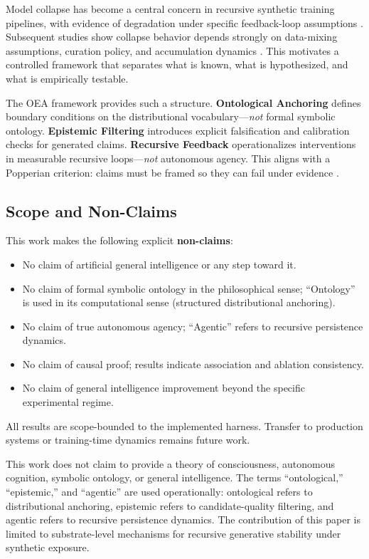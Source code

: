 \documentclass[11pt]{article}
\begin{document}
Model collapse has become a central concern in recursive synthetic training pipelines, with evidence of degradation under specific feedback-loop assumptions \cite{shumailov2024modelcollapse,fu2025theoretical}. Subsequent studies show collapse behavior depends strongly on data-mixing assumptions, curation policy, and accumulation dynamics \cite{gerstgrasser2024inevitable,schaeffer2025position}. This motivates a controlled framework that separates what is known, what is hypothesized, and what is empirically testable.

The OEA framework provides such a structure. \textbf{Ontological Anchoring} defines boundary conditions on the distributional vocabulary---\emph{not} formal symbolic ontology. \textbf{Epistemic Filtering} introduces explicit falsification and calibration checks for generated claims. \textbf{Recursive Feedback} operationalizes interventions in measurable recursive loops---\emph{not} autonomous agency. This aligns with a Popperian criterion: claims must be framed so they can fail under evidence \cite{popper1959logic}.

\subsection{Scope and Non-Claims}
\label{sec:nonclaims}

This work makes the following explicit \textbf{non-claims}:
\begin{itemize}[noitemsep]
  \item No claim of artificial general intelligence or any step toward it.
  \item No claim of formal symbolic ontology in the philosophical sense; ``Ontology'' is used in its computational sense (structured distributional anchoring).
  \item No claim of true autonomous agency; ``Agentic'' refers to recursive persistence dynamics.
  \item No claim of causal proof; results indicate association and ablation consistency.
  \item No claim of general intelligence improvement beyond the specific experimental regime.
\end{itemize}
All results are scope-bounded to the implemented harness. Transfer to production systems or training-time dynamics remains future work.

This work does not claim to provide a theory of consciousness, autonomous cognition, symbolic ontology, or general intelligence. The terms ``ontological,'' ``epistemic,'' and ``agentic'' are used operationally: ontological refers to distributional anchoring, epistemic refers to candidate-quality filtering, and agentic refers to recursive persistence dynamics. The contribution of this paper is limited to substrate-level mechanisms for recursive generative stability under synthetic exposure.
\end{document}
